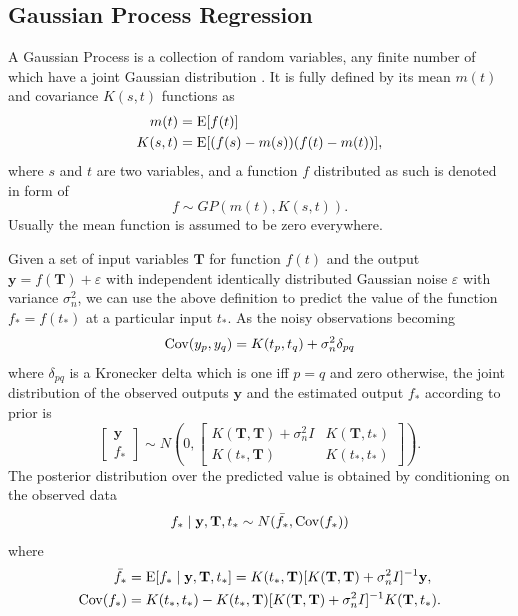 \subsection{Gaussian Process Regression}

A Gaussian Process is a collection of random variables, any finite number of which have a joint Gaussian distribution \cite{b_gpml}. It is fully defined by its mean $m(t)$ and covariance $K(s,t)$ functions as
\begin{align}
m(t)&=\mathrm{E} [f(t)] \\
K(s,t)&=\mathrm{E} \lbrack (f(s)-m(s)) (f(t)-m(t))\rbrack,
\end{align}
where $s$ and $t$ are two variables, and a function $f$ distributed as such is denoted in form of
\begin{equation}
f \sim GP(m(t),K(s,t)).
\end{equation}
Usually the mean function is assumed to be zero everywhere. 

Given a set of input variables $\mathbf{T}$ for function $f(t)$ and the output $\mathbf{y}=f(\mathbf{T})+\varepsilon$ with independent identically distributed Gaussian noise $\varepsilon$ with variance $\sigma_n^2$,  we can use the above definition to predict the value of the function $f_*=f(t_*)$ at a particular input $t_*$. As the noisy observations becoming
\begin{align}\label{GaussianProcessCovDef}
\mathrm{Cov} (y_p,y_q) = K(t_p,t_q)+\sigma_n^2 \delta_{pq}
\end{align}
where $\delta_{pq}$ is a Kronecker delta which is one iff $p=q$ and zero otherwise, the joint distribution of the observed outputs $\mathbf{y}$ and the estimated output $f_*$ according to prior is
\begin{equation}
\begin{bmatrix}
\mathbf{y}\\
f_*
\end{bmatrix} \sim N \left(  
0,  \begin{bmatrix}
K(\mathbf{T},\mathbf{T}) +\sigma_n^2I& K(\mathbf{T},t_*) \\
K(t_*,\mathbf{T}) & K(t_*,t_*)
\end{bmatrix} 
\right).
\end{equation}
The posterior distribution over the predicted value is obtained by conditioning on the observed data
\begin{equation}
f_* \mid  \mathbf{y},\mathbf{T},t_* \sim N(\bar{f_*},\mathrm{Cov} (f_*))
\end{equation}
where 
\begin{align}
\bar{f_*}&=\mathrm{E} [f_* \mid  \mathbf{y},\mathbf{T},t_* ]=K(t_*,\mathbf{T})[K(\mathbf{T},\mathbf{T})+\sigma_n^2I]^{-1}\mathbf{y},\\
\mathrm{Cov}(f_*)&=K(t_*,t_*)-K(t_*,\mathbf{T})[K(\mathbf{T},\mathbf{T})+\sigma_n^2I]^{-1}K(\mathbf{T},t_*).
\end{align}


